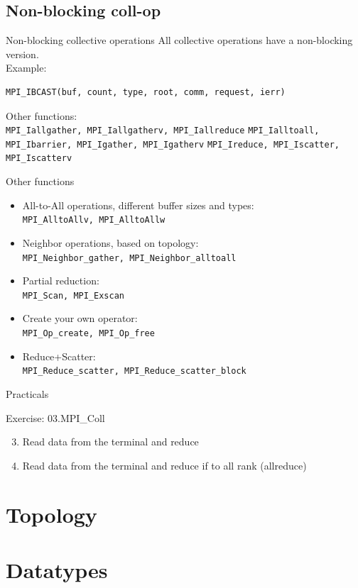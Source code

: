 \documentclass[aspectratio=43]{beamer}
\begin{document}
\subsection{Non-blocking coll-op}
\begin{frame}[fragile]{Non-blocking collective operations}
All collective operations have a non-blocking version.\\
Example:
\footnotesize
\begin{verbatim}
MPI_IBCAST(buf, count, type, root, comm, request, ierr)
\end{verbatim}
\normalsize
Other functions:\\
\verb+MPI_Iallgather, MPI_Iallgatherv, MPI_Iallreduce+
\verb+MPI_Ialltoall, MPI_Ibarrier, MPI_Igather, MPI_Igatherv+
\verb+MPI_Ireduce, MPI_Iscatter, MPI_Iscatterv+
\end{frame}

\begin{frame}[fragile]{Other functions}
\begin{itemize}
    \item All-to-All operations, different buffer sizes and types:\\\hspace{1cm}\verb+MPI_AlltoAllv, MPI_AlltoAllw+
    \item Neighbor operations, based on topology:\\\hspace{1cm}\verb+MPI_Neighbor_gather, MPI_Neighbor_alltoall+
    \item Partial reduction:\\\hspace{1cm}\verb+MPI_Scan, MPI_Exscan+
    \item Create your own operator:\\\hspace{1cm}\verb+MPI_Op_create, MPI_Op_free+
    \item Reduce+Scatter:\\\hspace{1cm}\verb+MPI_Reduce_scatter, MPI_Reduce_scatter_block+
\end{itemize}
\end{frame}

\begin{frame}{Practicals}
    \begin{brown2block}{Exercise: 03.MPI\_Coll}
    \begin{enumerate}
        \setcounter{enumi}{2}
        \item Read data from the terminal and reduce
        \item Read data from the terminal and reduce if to all rank (allreduce)
    \end{enumerate}
    \end{brown2block}
\end{frame}

\section{Topology}
\section{Datatypes}

\end{document}
